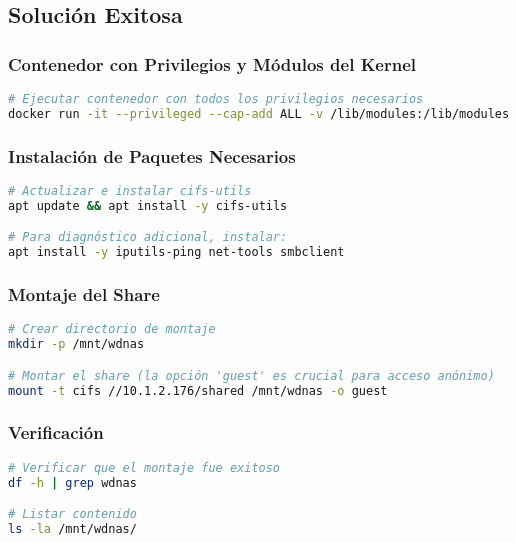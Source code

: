 \documentclass[12pt, a4paper]{article}
\begin{document}
\subsection{Solución Exitosa}
\label{subsec:solucion_montaje}

\subsubsection{Contenedor con Privilegios y Módulos del Kernel}
\begin{lstlisting}[language=bash, caption=Ejecución de contenedor con privilegios]
# Ejecutar contenedor con todos los privilegios necesarios
docker run -it --privileged --cap-add ALL -v /lib/modules:/lib/modules ubuntu:rolling /bin/bash
\end{lstlisting}

\subsubsection{Instalación de Paquetes Necesarios}
\begin{lstlisting}[language=bash, caption=Instalación de dependencias]
# Actualizar e instalar cifs-utils
apt update && apt install -y cifs-utils

# Para diagnóstico adicional, instalar:
apt install -y iputils-ping net-tools smbclient
\end{lstlisting}

\subsubsection{Montaje del Share}
\begin{lstlisting}[language=bash, caption=Montaje del share SMB/CIFS]
# Crear directorio de montaje
mkdir -p /mnt/wdnas

# Montar el share (la opción 'guest' es crucial para acceso anónimo)
mount -t cifs //10.1.2.176/shared /mnt/wdnas -o guest
\end{lstlisting}

\subsubsection{Verificación}
\begin{lstlisting}[language=bash, caption=Verificación del montaje]
# Verificar que el montaje fue exitoso
df -h | grep wdnas

# Listar contenido
ls -la /mnt/wdnas/
\end{lstlisting}
\end{document}

